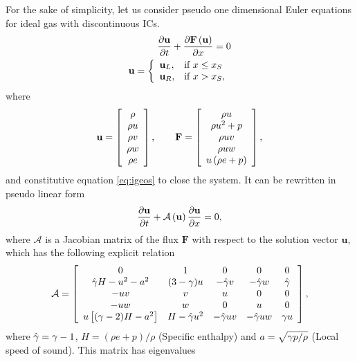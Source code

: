 For the sake of simplicity, let us consider pseudo one dimensional Euler equations for ideal gas with discontinuous ICs.
\begin{align}
\nonumber
\frac {\partial \mathbf u}{\partial t} + \frac {\partial \mathbf F \left(\mathbf u\right)}{\partial x} = 0 \\
\mathbf u = \left\{\begin{array}{ll}
\mathbf u_L, & \textmd{if } x \le x_S \\
\mathbf u_R, & \textmd{if } x > x_S,
\end{array}\right.
\end{align}
where 
\begin{align}
\mathbf u = \left[\begin{array}{c}\rho \\ \rho u \\ \rho v \\ \rho w \\ \rho e \end{array}\right], \qquad \mathbf F = \left[\begin{array}{c}\rho u \\ \rho u^2 + p \\ \rho uv \\ \rho u w \\ u \left(\rho e + p\right)\end{array}\right],
\end{align}
and constitutive equation \eqref{eq:igeos} to close the system. It can be rewritten in pseudo linear form
\begin{align}
\frac {\partial \mathbf u}{\partial t} + \mathcal A \left(\mathbf u\right)\frac {\partial \mathbf u}{\partial x} = 0, \label{eq:Euler}
\end{align}
where $\mathcal A$ is a Jacobian matrix of the flux $\mathbf F$ with respect to the solution vector $\mathbf u$, which has the following explicit relation
\begin{align}
\mathcal A = \left[\begin{array}{ccccc}
0 & 1 & 0 & 0 & 0 \\
\hat {\gamma} H - u^2 - a^2 & (3-\gamma)u & -\hat {\gamma} v  & -\hat {\gamma} w & \hat {\gamma} \\
-u v & v & u & 0 & 0 \\
-u w & w & 0 & u & 0 \\
u \left[(\gamma - 2)H - a^2\right] & H - \hat {\gamma} u^2 & - \hat {\gamma} u v & - \hat {\gamma} u w & \gamma u
\end{array}\right], \label{eq:matrix}
\end{align}
where $\hat {\gamma} = \gamma - 1$, $H = (\rho e + p)/\rho$ (Specific enthalpy) and $a = \sqrt{\gamma p / \rho}$ (Local speed of sound). This matrix has eigenvalues 
